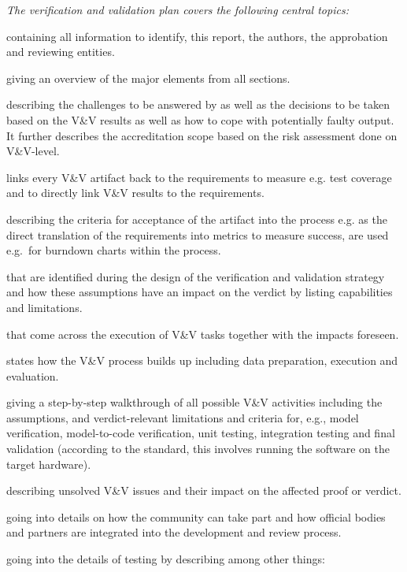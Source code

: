 \documentclass{template/openetcs_report}
\begin{document}
{\it
The verification and validation plan covers the following central topics:
\begin{description}\setlength{\parsep}{0pt}\setlength{\itemsep}{0pt}\setlength{\topsep}{0pt}
\item[Header] containing all information to identify, this report, the
  authors, the approbation and reviewing entities.
\item[Executive Summary] giving an overview of the major elements from
  all sections. 
\item[Problem Statement] describing the challenges to be answered by
  \VV as well as the decisions to be taken based on the V\&V results
  as well as how to cope with potentially faulty output. It further
  describes the accreditation scope based on the risk assessment done
  on V\&V-level. 
\item[V\&V Requirements Traceability Matrix] links every V\&V artifact
  back to the requirements to measure e.g. test coverage and to
  directly link V\&V results to the requirements. 
\item[Acceptability Criteria,] describing the criteria for acceptance
  of the artifact into the \VV process e.g. as the direct translation
  of the requirements into metrics to measure success, are used
  e.g.\ for burndown charts within the process. 
\item[Assumptions] that are identified during the design of the
  verification and validation strategy and how these assumptions have
  an impact on the verdict by listing capabilities and limitations. 
\item[Risks and Impacts] that come across the execution of V\&V tasks
  together with the impacts foreseen. 
\item[V\&V Design] states how the V\&V process builds up including
  data preparation, execution and evaluation. 
\item[V\&V Methodologies] giving a step-by-step walkthrough of all
  possible V\&V activities including the assumptions, and
  verdict-relevant limitations and criteria for, e.g.,  model
  verification, model-to-code verification, unit testing, integration
  testing and final validation (according to the standard, this
  involves running the software on the target hardware).  
\item[V\&V Issues] describing unsolved V\&V issues and their impact on
  the affected proof or verdict. 
\item[Peer Reviews] going into details on how the community can take
  part and how official bodies and partners are integrated into the
  development and review process. 
\item[Test Plan Definition] going into the details of testing by
  describing among other things: 


\end{description}}
\end{document}
